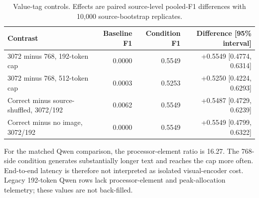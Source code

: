 \documentclass[11pt]{article}
\begin{document}
\begin{table}[H]
\centering
\caption{Value-tag controls. Effects are paired source-level pooled-F1
differences with 10,000 source-bootstrap replicates.}
\label{tab:s5_controls}
\small
\begin{tabular}{lrrr}
\toprule
Contrast & Baseline F1 & Condition F1 & Difference [95\% interval] \\
\midrule
3072 minus 768, 192-token cap & 0.0000 & 0.5549 & +0.5549 [0.4774, 0.6314] \\
3072 minus 768, 512-token cap & 0.0003 & 0.5253 & +0.5250 [0.4224, 0.6293] \\
Correct minus source-shuffled, 3072/192 & 0.0062 & 0.5549 & +0.5487 [0.4729, 0.6239] \\
Correct minus no image, 3072/192 & 0.0000 & 0.5549 & +0.5549 [0.4799, 0.6322] \\
\bottomrule
\end{tabular}
\end{table}

\begin{table}[H]
\centering
\caption{Recorded operating quantities. Tensor elements are processor
outputs, not asserted visual-token counts. Peak memory is observed allocated
memory on the H200 run.}
\label{tab:s5_budget}
\scriptsize
{}
\end{table}

For the matched Qwen comparison, the processor-element ratio is 16.27. The
768-side condition generates substantially longer text and reaches the cap
more often. End-to-end latency is therefore not interpreted as isolated
visual-encoder cost. Legacy 192-token Qwen rows lack processor-element and
peak-allocation telemetry; these values are not back-filled.
\end{document}
